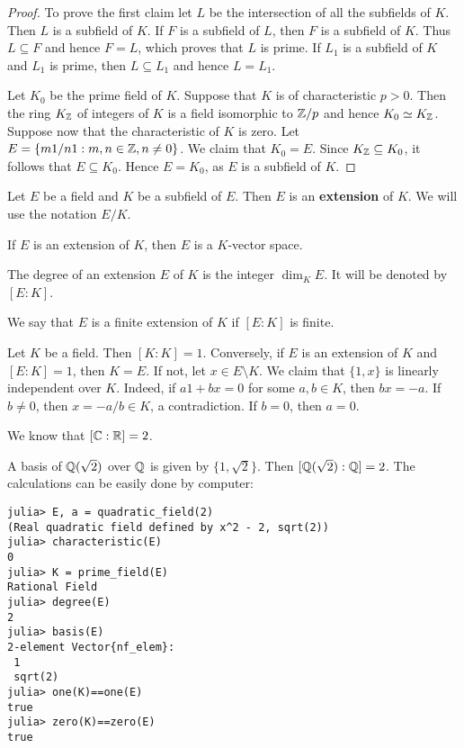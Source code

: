 \begin{proof}
	To prove the first claim let $L$ be the intersection
	of all the subfields of $K$. Then $L$ is a subfield of $K$. 
	If $F$ is a subfield of $L$, then $F$ is a subfield
	of $K$. Thus $L\subseteq F$ and hence $F=L$, which proves
	that $L$ is prime. If $L_1$ is a subfield of $K$
	and $L_1$ is prime, then $L\subseteq L_1$ and 
	hence $L=L_1$. 

	Let $K_0$ be the prime field of $K$. Suppose that $K$ is of characteristic
	$p>0$. Then the ring $K_{\mathbb{Z}}$ of integers of $K$ 
	is a field isomorphic to $\mathbb{Z}/p$ and hence $K_0\simeq
	K_{\mathbb{Z}}$. Suppose now that the characteristic of $K$ is zero. Let
	$E=\{m1/n1:m,n\in\mathbb{Z},n\ne 0\}$. We claim that $K_0=E$. Since $K_{\mathbb{Z}}\subseteq
	K_0$, it follows that $E\subseteq K_0$. Hence $E=K_0$, as $E$ is a subfield
	of $K$.  
\end{proof}

\begin{definition}
	Let $E$ be a field and $K$ be a subfield of $E$. Then 
	$E$ is an \textbf{extension} of $K$. We will use
	the notation $E/K$. 
\end{definition}

If $E$ is an extension of $K$, then $E$ is a
$K$-vector space. 

\begin{definition}
	The degree of an extension $E$ of $K$ 
	is the integer $\dim_KE$. It will be denoted by $[E:K]$. 
\end{definition}

We say that $E$ is a finite extension of $K$ 
if $[E:K]$ is finite. 

\begin{example}
	Let $K$ be a field. Then $[K:K]=1$. Conversely, 
	if $E$ is an extension of $K$ and $[E:K]=1$, then $K=E$. 
	If not, let $x\in E\setminus K$. We claim that
	$\{1,x\}$ is linearly independent over $K$. Indeed, 
	if $a1+bx=0$ for some $a,b\in K$, then $bx=-a$. If 
	$b\ne 0$, then $x=-a/b\in K$, a contradiction. If $b=0$, then 
	$a=0$. 
\end{example}

We know that $[\mathbb{C}:\mathbb{R}]=2$. 

\begin{example}
	A basis of $\mathbb{Q}(\sqrt{2})$ over $\mathbb{Q}$ 
	is given by $\{1,\sqrt{2}\}$. Then 
	$[\mathbb{Q}(\sqrt{2}):\mathbb{Q}]=2$. The calculations 
	can be easily done by computer: 
\begin{lstlisting}
julia> E, a = quadratic_field(2)
(Real quadratic field defined by x^2 - 2, sqrt(2))
julia> characteristic(E)
0
julia> K = prime_field(E)
Rational Field
julia> degree(E)
2
julia> basis(E)
2-element Vector{nf_elem}:
 1
 sqrt(2)
julia> one(K)==one(E)
true
julia> zero(K)==zero(E)
true
\end{lstlisting}
\end{example}

